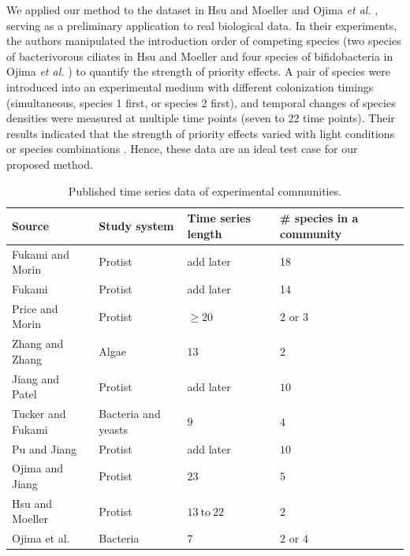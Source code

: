 \documentclass[12pt, class=article, crop=false]{standalone}
\begin{document}
We applied our method to the dataset in Hsu and Moeller \citep{hsu_metabolic_2021} and Ojima \textit{et al.} \citep{ojima_priority_2022}, serving as a preliminary application to real biological data.
In their experiments, the authors manipulated the introduction order of competing species (two species of bacterivorous ciliates in Hsu and Moeller \citep{hsu_metabolic_2021} and four species of bifidobacteria in Ojima \textit{et al.} \citep{ojima_priority_2022}) to quantify the strength of priority effects.
A pair of species were introduced into an experimental medium with different colonization timings (simultaneous, species 1 first, or species 2 first), and temporal changes of species densities were measured at multiple time points (seven to 22 time points).
Their results indicated that the strength of priority effects varied with light conditions \citep{hsu_metabolic_2021} or species combinations \citep{ojima_priority_2022}.
Hence, these data are an ideal test case for our proposed method.

\begin{table}
    \flushleft
    \caption{Published time series data of experimental communities.}
    \begin{tabular}{llll}
         Source & Study system & Time series length & \# species in a community\\
         \hline
         Fukami and Morin \citep{fukami_productivity-biodiversity_2003} & Protist & add later & 18\\
         Fukami \citep{fukami_assembly_2004} & Protist & add later & 14\\
         Price and Morin \citep{price_colonization_2004} & Protist & $\ge 20$ & $2$ or $3$ \\
         Zhang and Zhang \citep{zhang_colonization_2007} & Algae & $13$ & $2$\\
         Jiang and Patel \citep{jiang_community_2008} & Protist & add later & $10$\\
         Tucker and Fukami \citep{tucker_environmental_2014} & Bacteria and yeasts & $9$ & $4$\\
         Pu and Jiang \citep{pu_dispersal_2015} & Protist & add later & $10$\\
         Ojima and Jiang \citep{ojima_interactive_2017} & Protist & $23$ & $5$\\
         Hsu and Moeller \citep{hsu_metabolic_2021} & Protist & $13~\mbox{to}~22$ & $2$\\
         Ojima et al. \citep{ojima_priority_2022} & Bacteria & $7$ & $2$ or $4$\\
         \hline
    \end{tabular}
    \label{tab:expdata}
\end{table}
\end{document}
